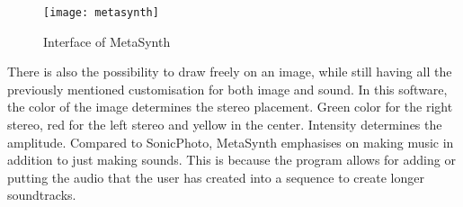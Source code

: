 \begin{figure}[!h] 
\centering
\texttt{[image: metasynth]}
\caption{\label{fig:metasynth} Interface of MetaSynth \cite{UISoftware2014}}
\end{figure}

There is also the possibility to draw freely on an image, while still having all the previously mentioned customisation for both image and sound. In this software, the color of the image determines the stereo placement. Green color for the right stereo, red for the left stereo and yellow in the center. Intensity determines the amplitude. 
Compared to SonicPhoto, MetaSynth emphasises on making music in addition to just making sounds. This is because the program allows for adding or putting the audio that the user has created into a sequence to create longer soundtracks.
